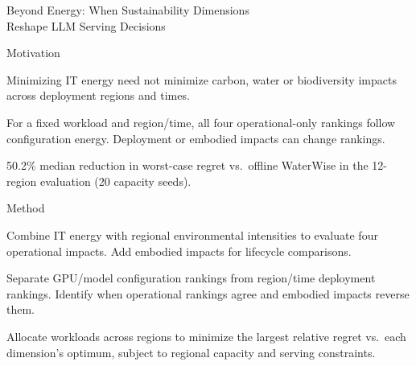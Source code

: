 \begin{frame}[t]{Beyond Energy: When Sustainability Dimensions\\Reshape LLM Serving Decisions}
\vspace{.02cm}
\begin{minipage}[t][3.25cm][t]{\linewidth}
\begin{summarysection}{Motivation}
\item {} Minimizing IT energy need not minimize carbon, water or biodiversity impacts across deployment regions and times.
\item {} For a fixed workload and region/time, all four operational-only rankings follow configuration energy. Deployment or embodied impacts can change rankings.
\item {} 50.2\% median reduction in worst-case regret vs.\ offline WaterWise in the 12-region evaluation (20 capacity seeds).
\end{summarysection}
\end{minipage}
\vspace{.18cm}
\begin{summarysection}{Method}
\item {} Combine IT energy with regional environmental intensities to evaluate four operational impacts. Add embodied impacts for lifecycle comparisons.
\item {} Separate GPU/model configuration rankings from region/time deployment rankings. Identify when operational rankings agree and embodied impacts reverse them.
\item {} Allocate workloads across regions to minimize the largest relative regret vs.\ each dimension's optimum, subject to regional capacity and serving constraints.
\end{summarysection}
\end{frame}
